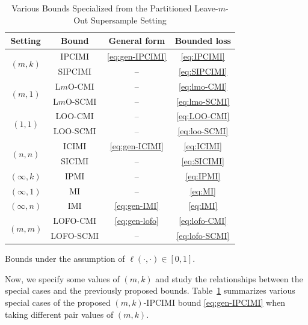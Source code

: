 \documentclass[onecolumn,romanappendices,10pt]{IEEEtran}
\begin{document}
	\begin{table}[t]
		\centering
		\caption{Various Bounds Specialized from the Partitioned Leave-$m$-Out Supersample Setting}
		\begin{threeparttable}
			\begin{tabular}{|c|c|c|c|} \hline
				Setting & Bound & General form & Bounded loss\tnote{$\dag$} \\ \hline\hline
				\multirow{2}{*}{$(m, k)$} & IPCIMI & \eqref{eq:gen-IPCIMI} & \eqref{eq:IPCIMI} \\ \cline{2-4}
				& SIPCIMI & -- & \eqref{eq:SIPCIMI} \\ \hline
				\multirow{2}{*}{$(m, 1)$} & L$m$O-CMI & -- & \eqref{eq:lmo-CMI} \\ \cline{2-4}
				& L$m$O-SCMI & -- & \eqref{eq:lmo-SCMI} \\ \hline
				\multirow{2}{*}{$(1, 1)$} & LOO-CMI \cite{rammal2022leave} & -- & \eqref{eq:LOO-CMI} \\ \cline{2-4}
				& LOO-SCMI & -- & \eqref{eq:loo-SCMI} \\ \hline
				\multirow{2}{*}{$(n, n)$} & ICIMI \cite{zhou2022individually} & \eqref{eq:gen-ICIMI} & \eqref{eq:ICIMI} \\ \cline{2-4}
				& SICIMI \cite{dongexactly} & -- & \eqref{eq:SICIMI} \\ \hline
				$(\infty, k)$ & IPMI & -- & \eqref{eq:IPMI} \\ \hline
				$(\infty, 1)$ & MI \cite{xu2017information} & -- & \eqref{eq:MI} \\ \hline
				$(\infty, n)$ & IMI \cite{bu2020tightening} & \eqref{eq:gen-IMI} & \eqref{eq:IMI} \\ \hline
				\multirow{2}{*}{$(m, m)$} & LOFO-CMI & \eqref{eq:gen-lofo} & \eqref{eq:lofo-CMI} \\ \cline{2-4}
				& LOFO-SCMI & -- & \eqref{eq:lofo-SCMI} \\ \hline
			\end{tabular}
			\begin{tablenotes} \footnotesize
				\item[$\dag$] Bounds under the assumption of $\ell(\cdot, \cdot) \in [0,1]$.
			\end{tablenotes} 
		\end{threeparttable} 
		\label{tab:special_cases}
	\end{table}
	
	Now, we specify some values of $(m, k)$ and study the relationships between the special cases and the previously proposed bounds. Table~\ref{tab:special_cases} summarizes various special cases of the proposed $(m, k)$-IPCIMI bound \eqref{eq:gen-IPCIMI} when taking different pair values of $(m, k)$.
	
\end{document}
